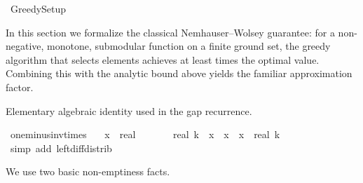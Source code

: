 \begin{isabellebody}
\isamarkupfalse%
\ Greedy{\isacharunderscore}{\kern0pt}Setup\isanewline
{}%
\isadelimdocument
%
\endisadelimdocument
%
\isatagdocument
%
\isamarkuptrue%
%
\endisatagdocument
{\isafolddocument}%
%
\isadelimdocument
%
\endisadelimdocument
%
\begin{isamarkuptext}%
In this section we formalize the classical Nemhauser–Wolsey guarantee:
  for a non-negative, monotone, submodular function on a finite ground set,
  the greedy algorithm that selects  elements achieves at least
   times the optimal value. Combining this with the analytic
  bound above yields the familiar  approximation factor.%
\end{isamarkuptext}\isamarkuptrue%
%
\begin{isamarkuptext}%
Elementary algebraic identity used in the gap recurrence.%
\end{isamarkuptext}\isamarkuptrue%
\isamarkupfalse%
\ one{\isacharunderscore}{\kern0pt}minus{\isacharunderscore}{\kern0pt}inv{\isacharunderscore}{\kern0pt}times{\isacharcolon}{\kern0pt}\isanewline
\ \ \ x\ {\isacharcolon}{\kern0pt}{\isacharcolon}{\kern0pt}\ real\isanewline
\ \ \ {\isachardoublequoteopen}{\isacharparenleft}{\kern0pt}{}\ {\isacharminus}{\kern0pt}\ {}\ {\isacharslash}{\kern0pt}\ real\ k{\isacharparenright}{\kern0pt}\ {\isacharasterisk}{\kern0pt}\ x\ {\isacharequal}{\kern0pt}\ x\ {\isacharminus}{\kern0pt}\ x\ {\isacharslash}{\kern0pt}\ real\ k{\isachardoublequoteclose}\isanewline
%
\isadelimproof
\ \ %
\endisadelimproof
%
\isatagproof
{}\isamarkupfalse%
\ {\isacharparenleft}{\kern0pt}simp\ add{\isacharcolon}{\kern0pt}\ left{\isacharunderscore}{\kern0pt}diff{\isacharunderscore}{\kern0pt}distrib{\isacharparenright}{\kern0pt}%
\endisatagproof
{\isafoldproof}%
%
\isadelimproof
%
\endisadelimproof
%
\isadelimdocument
%
\endisadelimdocument
%
\isatagdocument
%
\isamarkuptrue%
%
\isamarkuptrue%
%
\endisatagdocument
{\isafolddocument}%
%
\isadelimdocument
%
\endisadelimdocument
%
\begin{isamarkuptext}%
We use two basic non-emptiness facts.


\end{isamarkuptext}
\end{isabellebody}
